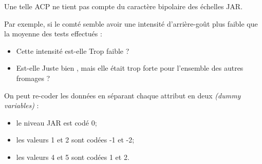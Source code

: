 \documentclass[aspectratio=169,xcolor=dvipsnames]{beamer}
\begin{document}
\begin{frame}
	\textcolor{nyubluedarker}{\faCogs} Une telle ACP ne tient pas compte du caractère bipolaire des échelles JAR.
	
	\medskip
	
		\textcolor{nyubluedarker}{\faCogs} Par exemple, si le comté semble avoir une intensité d'arrière-goût plus faible que la moyenne des tests effectués :
			\begin{itemize}
			\item Cette intensité est-elle \og Trop faible \fg{} ?
			\item Est-elle \og Juste bien \fg{}, mais elle était trop forte pour l'ensemble des autres fromages ?  
			\end{itemize}
			
	\medskip
	
	\textcolor{nyubluedarker}{\faLightbulb[regular]} On peut re-coder les données en séparant chaque attribut en deux \emph{(dummy variables)} :
		\begin{itemize}
		\item le niveau JAR est codé 0;
		\item les valeurs 1 et 2 sont codées -1 et -2;
		\item les valeurs 4 et 5 sont codées 1 et 2.
		\end{itemize}
\end{frame}
\end{document}
